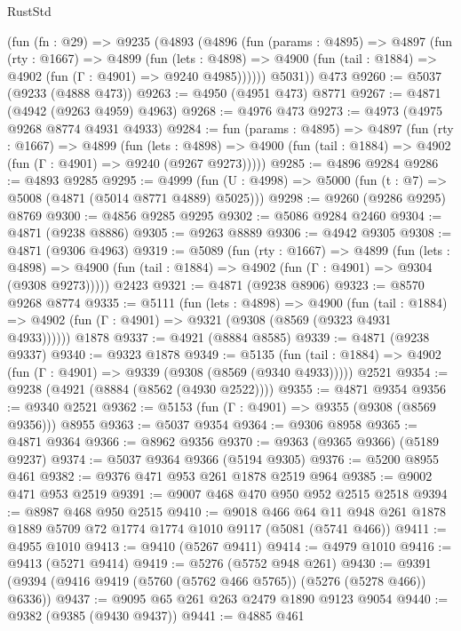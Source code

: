 \begin{lexlean}{RustStd}
\begin{coremodule}
{\begin{coremodule}
{{{{{{{{{{{{{{{{{{{{{{{{{{{{{    (fun (fn : @29) =>
    @9235
      (@4893
        (@4896
          (fun (params : @4895) =>
          @4897
            (fun (rty : @1667) =>
            @4899
              (fun (lets : @4898) =>
              @4900 (fun (tail : @1884) => @4902 (fun (Γ : @4901) => @9240 @4985))))))
        @5031))
    @473
@9260 := @5037 (@9233 (@4888 @473))
@9263 := @4950 (@4951 @473) @8771
@9267 := @4871 (@4942 (@9263 @4959) @4963)
@9268 := @4976 @473
@9273 := @4973 (@4975 @9268 @8774 @4931 @4933)
@9284 := fun (params : @4895) =>
  @4897
    (fun (rty : @1667) =>
    @4899
      (fun (lets : @4898) =>
      @4900 (fun (tail : @1884) => @4902 (fun (Γ : @4901) => @9240 (@9267 @9273)))))
@9285 := @4896 @9284
@9286 := @4893 @9285
@9295 := @4999 (fun (U : @4998) => @5000 (fun (t : @7) => @5008 (@4871 (@5014 @8771 @4889) @5025)))
@9298 := @9260 (@9286 @9295) @8769
@9300 := @4856 @9285 @9295
@9302 := @5086 @9284 @2460
@9304 := @4871 (@9238 @8886)
@9305 := @9263 @8889
@9306 := @4942 @9305
@9308 := @4871 (@9306 @4963)
@9319 := @5089
    (fun (rty : @1667) =>
    @4899
      (fun (lets : @4898) =>
      @4900 (fun (tail : @1884) => @4902 (fun (Γ : @4901) => @9304 (@9308 @9273)))))
    @2423
@9321 := @4871 (@9238 @8906)
@9323 := @8570 @9268 @8774
@9335 := @5111
    (fun (lets : @4898) =>
    @4900
      (fun (tail : @1884) => @4902 (fun (Γ : @4901) => @9321 (@9308 (@8569 (@9323 @4931 @4933))))))
    @1878
@9337 := @4921 (@8884 @8585)
@9339 := @4871 (@9238 @9337)
@9340 := @9323 @1878
@9349 := @5135
    (fun (tail : @1884) => @4902 (fun (Γ : @4901) => @9339 (@9308 (@8569 (@9340 @4933)))))
    @2521
@9354 := @9238 (@4921 (@8884 (@8562 (@4930 @2522))))
@9355 := @4871 @9354
@9356 := @9340 @2521
@9362 := @5153 (fun (Γ : @4901) => @9355 (@9308 (@8569 @9356))) @8955
@9363 := @5037 @9354
@9364 := @9306 @8958
@9365 := @4871 @9364
@9366 := @8962 @9356
@9370 := @9363 (@9365 @9366) (@5189 @9237)
@9374 := @5037 @9364 @9366 (@5194 @9305)
@9376 := @5200 @8955 @461
@9382 := @9376 @471 @953 @261 @1878 @2519 @964
@9385 := @9002 @471 @953 @2519
@9391 := @9007 @468 @470 @950 @952 @2515 @2518
@9394 := @8987 @468 @950 @2515
@9410 := @9018
    @466
    @64
    @11
    @948
    @261
    @1878
    @1889
    @5709
    @72
    @1774
    @1774
    @1010
    @9117
    (@5081 (@5741 @466))
@9411 := @4955 @1010
@9413 := @9410 (@5267 @9411)
@9414 := @4979 @1010
@9416 := @9413 (@5271 @9414)
@9419 := @5276 (@5752 @948 @261)
@9430 := @9391 (@9394 (@9416 @9419 (@5760 (@5762 @466 @5765)) (@5276 (@5278 @466)) @6336))
@9437 := @9095 @65 @261 @263 @2479 @1890 @9123 @9054
@9440 := @9382 (@9385 (@9430 @9437))
@9441 := @4885 @461
}}}}}}}}}}}}}}}}}}}}}}}}}}}}}
\end{coremodule}}
\end{coremodule}
\end{lexlean}

